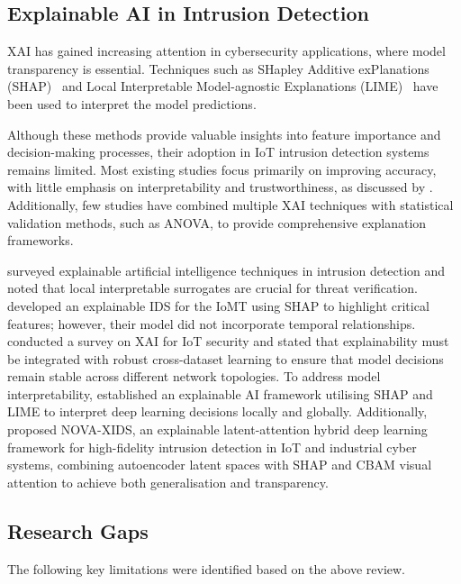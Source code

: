 \documentclass[a4paper,fleqn]{cas-sc}
\begin{document}
\subsection{Explainable AI in Intrusion Detection}

XAI has gained increasing attention in cybersecurity applications, where model transparency is essential. Techniques such as SHapley Additive exPlanations (SHAP)~\citep{lundberg2017unified} and Local Interpretable Model-agnostic Explanations (LIME)~\citep{ribeiro2016why} have been used to interpret the model predictions.

Although these methods provide valuable insights into feature importance and decision-making processes, their adoption in IoT intrusion detection systems remains limited. Most existing studies focus primarily on improving accuracy, with little emphasis on interpretability and trustworthiness, as discussed by \cite{hnamte2024iot}. Additionally, few studies have combined multiple XAI techniques with statistical validation methods, such as ANOVA, to provide comprehensive explanation frameworks.

\cite{almimi2023xai} surveyed explainable artificial intelligence techniques in intrusion detection and noted that local interpretable surrogates are crucial for threat verification. \cite{shaaban2023biomt} developed an explainable IDS for the IoMT using SHAP to highlight critical features; however, their model did not incorporate temporal relationships. \cite{liu2022explainable} conducted a survey on XAI for IoT security and stated that explainability must be integrated with robust cross-dataset learning to ensure that model decisions remain stable across different network topologies. To address model interpretability, \cite{singh2023xai} established an explainable AI framework utilising SHAP and LIME to interpret deep learning decisions locally and globally. Additionally, \cite{gupta2026novaxids} proposed NOVA-XIDS, an explainable latent-attention hybrid deep learning framework for high-fidelity intrusion detection in IoT and industrial cyber systems, combining autoencoder latent spaces with SHAP and CBAM visual attention to achieve both generalisation and transparency.

\subsection{Research Gaps}

The following key limitations were identified based on the above review.
\end{document}
